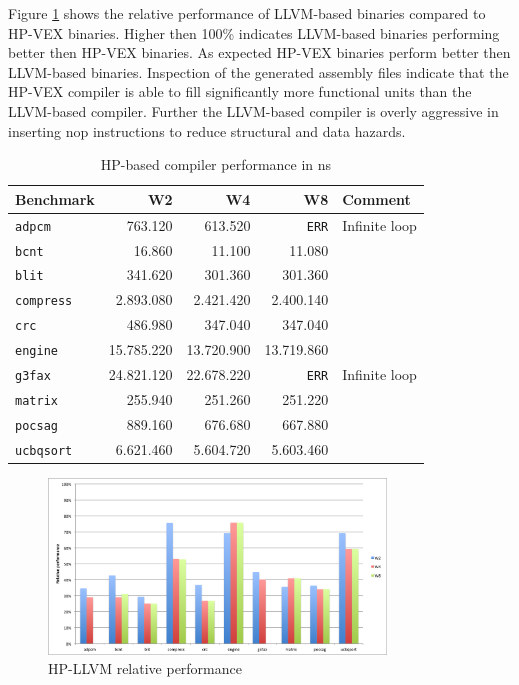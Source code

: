 Figure \ref{fig:rel_HP} shows the relative performance of LLVM-based binaries compared to HP-VEX binaries. Higher then 100\% indicates LLVM-based binaries performing better then HP-VEX binaries. As expected HP-VEX binaries perform better then LLVM-based binaries. Inspection of the generated assembly files indicate that the HP-VEX compiler is able to fill significantly more functional units than the LLVM-based compiler. Further the LLVM-based compiler is overly aggressive in inserting nop instructions to reduce structural and data hazards.

\begin{table}
  \centering
    \begin{tabular}{|l|r|r|r|l|}
    \hline
    \textbf{Benchmark} & \multicolumn{1}{|r|}{\textbf{W2}} & \multicolumn{1}{|r|}{\textbf{W4}}  & \multicolumn{1}{|r|}{\textbf{W8}} & \textbf{Comment} \\ \hline
	\texttt{adpcm} 		&   763.120 	&   613.520 	&   \texttt{ERR} 	& Infinite loop	\\ \hline
	\texttt{bcnt} 		&   16.860 		&   11.100 		&   11.080 			& 	\\ \hline
	\texttt{blit} 		&   341.620 	&   301.360 	&   301.360 		& 	\\ \hline
	\texttt{compress} 	&   2.893.080 	&   2.421.420 	&   2.400.140 		& 	\\ \hline
	\texttt{crc} 		&   486.980 	&   347.040 	&   347.040 		& 	\\ \hline
	\texttt{engine} 	&   15.785.220 	&   13.720.900 	&   13.719.860 		& 	\\ \hline
	\texttt{g3fax} 		&   24.821.120 	&   22.678.220 	&   \texttt{ERR} 	& Infinite loop	\\ \hline
	\texttt{matrix} 	&   255.940 	&   251.260 	&   251.220 		& 	\\ \hline
	\texttt{pocsag} 	&   889.160 	&   676.680 	&   667.880 		& 	\\ \hline
	\texttt{ucbqsort} 	&   6.621.460 	&   5.604.720 	&   5.603.460 		& 	\\ \hline
    \end{tabular}
  \caption{HP-based compiler performance in ns}
  \label{tbl:HP_perf}
\end{table}

\begin{figure}[h]
\centering
\includegraphics[width=0.8\textwidth]{5_results/img/rel_HP.png}
\caption{HP-LLVM relative performance}
\label{fig:rel_HP}
\end{figure}

